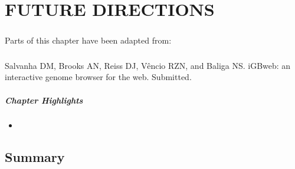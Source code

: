  
\chapter {\uppercase{Future Directions}}
\label{chap:6}

\paragraph{}
Parts of this chapter have been adapted from: 
\paragraph{}


Salvanha DM, Brooks AN, Reiss DJ, Vêncio RZN, and Baliga NS.  iGBweb: an interactive genome browser for the web. Submitted.

\paragraph{Chapter Highlights}

\begin{itemize}
\item 
\end{itemize}

\section{Summary}
 





 

 
 